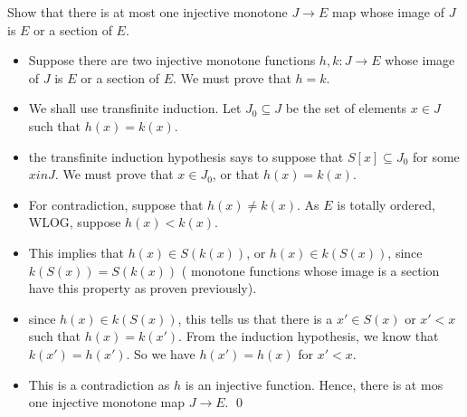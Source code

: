 \documentclass{article}
\begin{document}


 Show that there is at most one injective monotone $J \rightarrow E$ map whose image of $J$ is $E$ or a section of $E$.
\begin{itemize}
\item Suppose there are two injective monotone functions $h, k: J \rightarrow E$ whose image of $J$ is $E$ or a section of $E$. We must prove that $h = k$.
\item We shall use transfinite induction. Let $J_0 \subseteq J$ be the set of elements $x \in J$ such that $h(x) = k(x)$.
\item the transfinite induction hypothesis says to suppose that $S[x] \subseteq J_0$ for some $x in J$. We must prove that $x \in J_0$, or that $h(x) = k(x)$.
\item For contradiction, suppose that $h(x) \neq k(x)$. As $E$ is totally ordered, WLOG, suppose $h(x) < k(x)$.
\item This implies that $h(x) \in S(k(x))$, or $h(x) \in k(S(x))$, since $k(S(x)) = S(k(x))$ ( monotone functions whose image is a section have this property as proven previously).
\item since $h(x) \in k(S(x))$, this tells us that there is a $x' \in S(x)$ or $x' < x$ such that $h(x) = k(x')$. From the induction hypothesis, we know that $k(x') = h(x')$.
      So we have $h(x') = h(x)$ for $x' < x$.
\item This is a contradiction as $h$ is an injective function. Hence, there is at mos one injective monotone map $J \rightarrow E$.  \qed 
\end{itemize}
\end{document}
